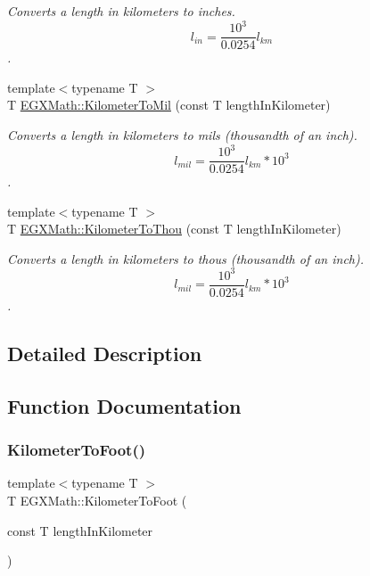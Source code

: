 \begin{DoxyCompactItemize}
\begin{DoxyCompactList}\small\item\em Converts a length in kilometers to inches. \[ l_{in}= \frac{10^{3}}{0.0254} l_{km} \]. \end{DoxyCompactList}\item 
{\footnotesize template$<$typename T $>$ }\\T \mbox{\hyperlink{group___e_g_x_math-_conversions-_length_conversions-_s_i-_kilometer-_imperial_ga4d25c16818235ceaad64d1119e23e01f}{E\+G\+X\+Math\+::\+Kilometer\+To\+Mil}} (const T length\+In\+Kilometer)
\begin{DoxyCompactList}\small\item\em Converts a length in kilometers to mils (thousandth of an inch). \[ l_{mil}= \frac{10^{3}}{0.0254} l_{km} * 10^{3} \]. \end{DoxyCompactList}\item 
{\footnotesize template$<$typename T $>$ }\\T \mbox{\hyperlink{group___e_g_x_math-_conversions-_length_conversions-_s_i-_kilometer-_imperial_gabcd7d2e467bc0e80c61257ba641d0f48}{E\+G\+X\+Math\+::\+Kilometer\+To\+Thou}} (const T length\+In\+Kilometer)
\begin{DoxyCompactList}\small\item\em Converts a length in kilometers to thous (thousandth of an inch). \[ l_{mil}= \frac{10^{3}}{0.0254} l_{km} * 10^{3} \]. \end{DoxyCompactList}\end{DoxyCompactItemize}


\subsection{Detailed Description}


\subsection{Function Documentation}
\mbox{\label{group___e_g_x_math-_conversions-_length_conversions-_s_i-_kilometer-_imperial_ga8e07a35f01e011462db88b5cb2896416}} 
\subsubsection{\texorpdfstring{Kilometer\+To\+Foot()}{KilometerToFoot()}}
{\footnotesize\ttfamily template$<$typename T $>$ \\
T E\+G\+X\+Math\+::\+Kilometer\+To\+Foot (\begin{DoxyParamCaption}\item[{const T}]{length\+In\+Kilometer }\end{DoxyParamCaption})}




